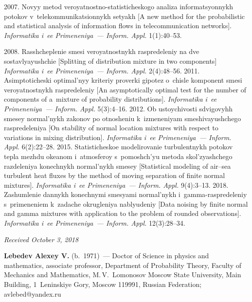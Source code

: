 \begin{multicols}{2}
{{\begin{thebibliography}{99}
 2007. Novyy metod veroyatnostno-statisticheskogo ana\-li\-za informatsyonnykh 
 potokov v~telekommunikatsionnykh setyakh
[A new method for the probabilistic and statistical analysis 
of information flows in telecommunication networks].
\textit{Informatika i~ee Primeneniya~--- Inform. Appl.} 1(1):40--53.

 2008. 
Rasshcheplenie smesi veroyatnostnykh raspredeleniy na dve sostavlyayushchie
[Splitting of distribution mixture in two components] 
\textit{Informatika i~ee Primeneniya~--- Inform. Appl.} 2(4):48--56.
2011. Asimptoticheski optimal'nyy kriteriy proverki gipotez 
o~chisle komponent smesi veroyatnostnykh raspredeleniy
 [An asymptotically optimal test for the number of components of 
 a~mixture of probability distributions]. 
 \textit{Informatika i~ee Primeneniya~--- Inform. Appl.} 5(3):4--16.
 2012. 
Ob ustoychivosti sdvigovyhh smesey normal'nykh zakonov po otnosheniu
k~izmeneniyam smeshivayushchego raspredeleniya [On stability of normal 
location mixtures with respect to variations in mixing distribution]. 
\textit{Informatika i~ee Primeneniya~--- Inform. Appl.} 6(2):22--28.
2015. Statisticheskoe
modelirovanie turbulentnykh potokov tepla mezhdu okeanom i~at\-mo\-sfe\-roy 
s~pomoshch'yu metoda skol'zyashchego
razdeleniya konechnykh normal'nykh smesey 
[Statistical modeling of air--sea turbulent heat fluxes by the method 
of moving separation of finite normal mixtures]. 
\textit{Informatika i~ee Primeneniya~--- Inform. Appl.} 9(4):3--13.
 2018. Zashumlenie dannykh konechnymi smesyami normal'nykh 
i~gamma-raspredeleniy s~primeneniem k~zadache okrugleniya nablyudeniy
[Data noising by finite normal and gamma mixtures with application 
to the problem of rounded observations].
\textit{Informatika i~ee Primeneniya~--- Inform. Appl.} 12(3):28--34.
\end{thebibliography}

 }
 }

\end{multicols}


\hfill{\small\textit{Received October 3, 2018}}



\Contrl

\noindent
\textbf{Lebedev Alexey V.} (b.\ 1971)~--- Doctor of Science in physics and mathematics,
associate professor, Department of Probability Theory, 
Faculty of Mechanics and Mathematics,
M.\,V.~Lomonosov Moscow State University, Main Building, 1~Leninskiye Gory,
Moscow 119991, Russian Federation; \mbox{avlebed@yandex.ru}
\label{end\stat}

\renewcommand{\bibname}{\protect\rm Литература}  
